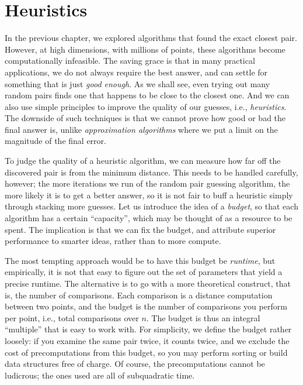
\chapter{Heuristics}

In the previous chapter, we explored algorithms that found the exact closest pair.
However, at high dimensions, with millions of points, these algorithms become
computationally infeasible. The saving grace is that in many practical applications, we do
not always require the best answer, and can settle for something that is just \textit{good enough}.
As we shall see, even trying out many random pairs finds one that happens to be close to
the closest one. And we can also use simple principles to improve the quality of our guesses,
i.e., \textit{heuristics}. The downside of such techniques is that we cannot prove how
good or bad the final answer is, unlike \textit{approximation algorithms} where we put a limit
on the magnitude of the final error.

To judge the quality of a heuristic algorithm, we can measure how far off the discovered pair is
from the minimum distance. This needs to be handled carefully, however; the more iterations we run
of the random pair guessing algorithm, the more likely it is to get a better answer, so it is not
fair to buff a heuristic simply through stacking more guesses. Let us introduce the idea of a
\textit{budget}, so that each algorithm has a certain ``capacity'', which may be thought of as
a resource to be spent. The implication is that we can fix the budget, and attribute superior performance
to smarter ideas, rather than to more compute.

The most tempting approach would be to have this budget be \textit{runtime}, but empirically, it is not
that easy to figure out the set of parameters that yield a precise runtime. The alternative is
to go with a more theoretical construct, that is, the number of comparisons. Each comparison
is a distance computation between two points, and the budget is the number of comparisons you
perform per point, i.e., total comparisons over $n$. The budget is thus an integral
``multiple'' that is easy to work with. For simplicity, we define the budget rather loosely:
if you examine the same pair twice, it counts twice, and we exclude the cost of precomputations
from this budget, so you may perform sorting or build data structures free of charge. Of course,
the precomputations cannot be ludicrous; the ones used are all of subquadratic time.


